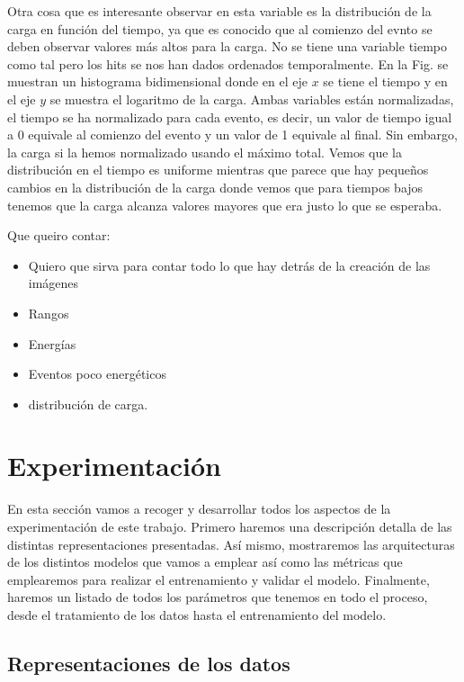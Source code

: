 \documentclass[a4paper,12pt,twoside,titlepage]{article}
\begin{document}
Otra cosa que es interesante observar en esta variable es la distribución de la carga en función del tiempo, ya que es conocido que al comienzo del evnto se deben observar valores más altos para la carga. No se tiene una variable tiempo como tal pero los hits se nos han dados ordenados temporalmente. En la Fig. se muestran un histograma bidimensional donde en el eje $x$ se tiene el tiempo y en el eje $y$ se muestra el logaritmo de la carga. Ambas variables están normalizadas, el tiempo se ha normalizado para cada evento, es decir, un valor de tiempo igual a 0 equivale al comienzo del evento y un valor de 1 equivale al final. Sin embargo, la carga si la hemos normalizado usando el máximo total. Vemos que la distribución en el tiempo es uniforme mientras que parece que hay pequeños cambios en la distribución de la carga donde vemos que para tiempos bajos tenemos que la carga alcanza valores mayores que era justo lo que se esperaba.



Que queiro contar:
\begin{itemize}
  \item Quiero que sirva para contar todo lo que hay detrás de la creación de las imágenes
  \item Rangos
  \item Energías
  \item Eventos poco energéticos
  \item distribución de carga.
\end{itemize}

\section{Experimentación}

En esta sección vamos a recoger y desarrollar todos los aspectos de la experimentación de este trabajo. Primero haremos una descripción detalla de las distintas representaciones presentadas. Así mismo, mostraremos las arquitecturas de los distintos modelos que vamos a emplear así como las métricas que emplearemos para realizar el entrenamiento y validar el modelo. Finalmente, haremos un listado de todos los parámetros que tenemos en todo el proceso, desde el tratamiento de los datos hasta el entrenamiento del modelo.

\subsection{Representaciones de los datos}
\end{document}
